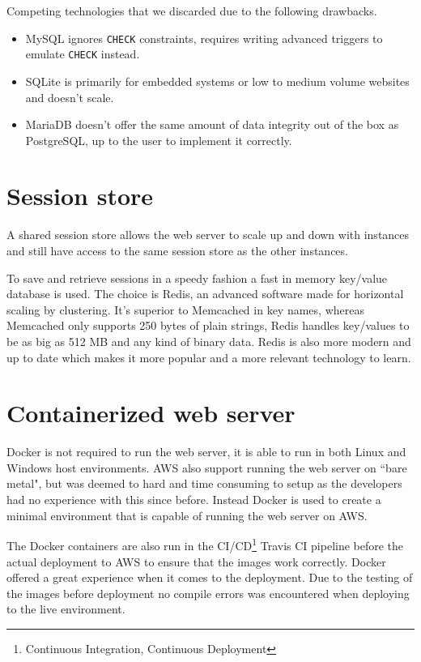 \documentclass[12pt,a4paper]{report}
\begin{document}
Competing technologies that we discarded due to the following drawbacks.
\begin{itemize}
    \item MySQL ignores \texttt{CHECK} constraints\cite{mysql-check-constraint}, requires writing advanced triggers to emulate \texttt{CHECK} instead\cite{mysql-emulate-check}.
    \item SQLite is primarily for embedded systems or low to medium volume websites and doesn't scale\cite{sqlite-when-to-use}.
    \item MariaDB doesn't offer the same amount of data integrity out of the box as \\ PostgreSQL\cite{mariadb-data-integrity}, up to the user to implement it correctly. 
\end{itemize}

\section{Session store}
A shared session store allows the web server to scale up and down with instances and still have access to the same session store as the other instances.

To save and retrieve sessions in a speedy fashion a fast in memory key/value database is used. The choice is Redis, an advanced software made for horizontal scaling by clustering. It's superior to Memcached in key names, whereas Memcached only supports 250 bytes of plain strings\cite{memcache-key-size}, Redis handles key/values to be as big as 512 MB\cite{redis-key-size} and any kind of binary data. Redis is also more modern and up to date which makes it more popular and a more relevant technology to learn\cite{key-value-comparison}\cite{redis-vs-memcached}.

\section{Containerized web server}
Docker\cite{why-docker} is not required to run the web server, it is able to run in both Linux and Windows host environments. AWS also support running the web server on ``bare metal", but was deemed to hard and time consuming to setup as the developers had no experience with this since before. Instead Docker is used to create a minimal environment that is capable of running the web server on AWS.

The Docker containers are also run in the CI/CD\footnote{Continuous Integration, Continuous Deployment} Travis CI pipeline before the actual deployment to AWS to ensure that the images work correctly. Docker offered a great experience when it comes to the deployment. Due to the testing of the images before deployment no compile errors was encountered when deploying to the live environment.
\end{document}
